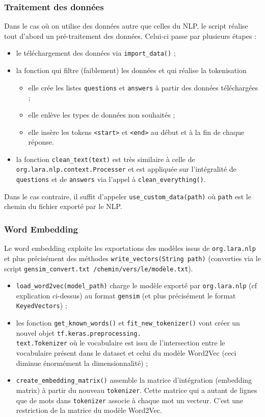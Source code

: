 \documentclass[10pt,a4paper]{article}
\begin{document}
\subsubsection{Traitement des données}
Dans le cas où on utilise des données autre que celles du NLP, le script réalise tout d'abord un pré-traitement des données. Celui-ci passe par plusieurs étapes :
\begin{itemize}
\item le téléchargement des données via \texttt{import\_data()} ;
\item la fonction qui filtre (faiblement) les données et qui réalise la tokenisation
\begin{itemize}
\item elle crée les listes \texttt{questions} et \texttt{answers} à partir des données téléchargées ;
\item elle enlève les types de données non souhaités ;
\item elle insère les tokens \texttt{<start>} et \texttt{<end>} au début et à la fin de chaque réponse.
\end{itemize}
\item la fonction \texttt{clean\_text(text)} est très similaire à celle de \texttt{org.lara.nlp.context.Processer} et est appliquée sur l'intégralité de \texttt{questions} et de \texttt{answers} via l'appel à \texttt{clean\_everything()}.
\end{itemize}
Dans le cas contraire, il suffit d'appeler \texttt{use\_custom\_data(path)} où \texttt{path} est le chemin du fichier exporté par le NLP.
 
\subsubsection{Word Embedding}
Le word embedding exploite les exportations des modèles issus de \texttt{org.lara.nlp} et plus précisément des méthodes \texttt{write\_vectors(String path)} (converties via le script \texttt{gensim\_convert.txt /chemin/vers/le/modèle.txt}).
\begin{itemize}
\item \texttt{load\_word2vec(model\_path)} charge le modèle exporté par \texttt{org.lara.nlp} (cf explication ci-dessus) au format \texttt{gensim} (et plus précisément le format \texttt{KeyedVectors}) ;
\item les fonction \texttt{get\_known\_words()} et \texttt{fit\_new\_tokenizer()} vont créer un nouvel objet \texttt{tf.keras.preprocessing.\\text.Tokenizer} où le vocabulaire est issu de l'intersection entre le vocabulaire présent dans le dataset et celui du modèle Word2Vec (ceci diminue énormément la dimensionnalité) ;
\item \texttt{create\_embedding\_matrix()} assemble la matrice d'intégration (embedding matrix) à partir du nouveau \texttt{tokenizer}. Cette matrice qui a autant de lignes que de mots dans \texttt{tokenizer} associe à chaque mot un vecteur. C'est une restriction de la matrice du modèle Word2Vec.
\end{itemize}
\end{document}
